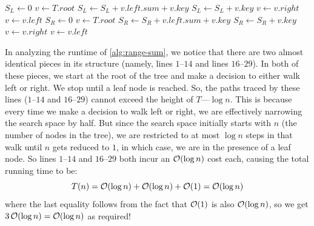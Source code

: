 \documentclass{article}
\begin{document}
\begin{enumerate}[leftmargin={*}, font={\bf}, label={\arabic*.}, ref={\arabic*}]
\begin{enumerate}[ref={(\alph*)}]
        \begin{minipage}{\linewidth}
          \begin{algorithm}[H]
            \caption{$\textsc{Range-Sum}(T,x_l,x_r)$}\label{alg:range-sum}
            \begin{algorithmic}[1]
              \State $S_L \gets 0$ 
              \State $v \gets T.root$
                    \State $S_L \gets S_L + v.left.sum + v.key$
                  \Else
                    \State $S_L \gets S_L + v.key$
                  \EndIf
                  \State $v \gets v.right$
                \Else
                  \State $v \gets v.left$
                \EndIf
              \EndWhile
              \State
              \State $S_R \gets 0$ 
              \State $v \gets T.root$
                    \State $S_R \gets S_R + v.left.sum + v.key$
                  \Else
                    \State $S_R \gets S_R + v.key$
                  \EndIf
                  \State $v \gets v.right$
                \Else
                  \State $v \gets v.left$
                \EndIf
              \EndWhile
              \State
              \State {} 
            \end{algorithmic}
          \end{algorithm}
        \end{minipage}

        In analyzing the runtime of \autoref{alg:range-sum}, we notice that there are two almost
        identical pieces in its structure (namely, lines $1$--$14$ and lines $16$--$29$). In both
        of these pieces, we start at the root of the tree and make a decision to either walk left
        or right. We stop until a leaf node is reached. So, the paths traced by these lines
        ($1$--$14$ and $16$--$29$) cannot exceed the height of $T$---$\log n$. This is because every
        time we make a decision to walk left or right, we are effectively narrowing the search space
        by half. But since the search space initially starts with $n$ (the number of nodes in the
        tree), we are restricted to at most $\log n$ steps in that walk until $n$ gets reduced to
        $1$, in which case, we are in the presence of a leaf node. So lines $1$--$14$ and $16$--$29$
        both incur an $\operatorname*{\mathcal{O}}(\log n)$ cost each, causing the total running time to be:
        \[
          T(n) = \operatorname*{\mathcal{O}}(\log n) + \operatorname*{\mathcal{O}}(\log n) + \operatorname*{\mathcal{O}}(1) = \operatorname*{\mathcal{O}}(\log n)
        \]
        where the last equality follows from the fact that $\operatorname*{\mathcal{O}}(1)$ is also $\operatorname*{\mathcal{O}}(\log n)$, so we get
        $3\operatorname*{\mathcal{O}}( \log n) = \operatorname*{\mathcal{O}}(\log n)$ as required!


\end{enumerate}
\end{enumerate}
\end{document}
